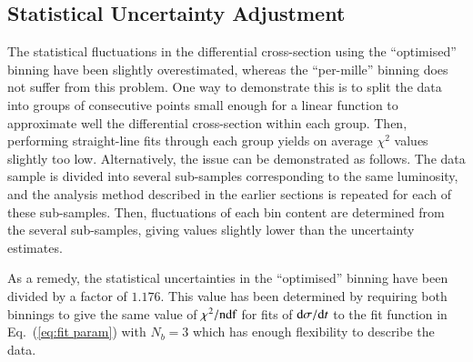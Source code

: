 
\subsection{Statistical Uncertainty Adjustment}
\label{sec:stat unc adj}

The statistical fluctuations in the differential cross-section using the ``optimised'' binning have been slightly overestimated, whereas the ``per-mille'' binning does not suffer from this problem. One way to demonstrate this is to split the data into groups of consecutive points small enough for a linear function to approximate well the differential cross-section within each group. Then, performing straight-line fits through each group yields on average $\chi^2$ values slightly too low. Alternatively, the issue can be demonstrated as follows. The data sample is divided into several sub-samples corresponding to the same luminosity, and the analysis method described in the earlier sections is repeated for each of these sub-samples. Then, fluctuations of each bin content are determined from the several sub-samples, giving values slightly lower than the uncertainty estimates.

As a remedy, the statistical uncertainties in the ``optimised'' binning have been divided by a factor of $1.176$. This value has been determined by requiring both binnings to give the same value of $\chi^2/\hbox{ndf}$ for fits of ${\rm d}\sigma / {\rm d} t$ to the fit function in Eq.~(\ref{eq:fit param}) with $N_b = 3$ which has enough flexibility to describe the data.


